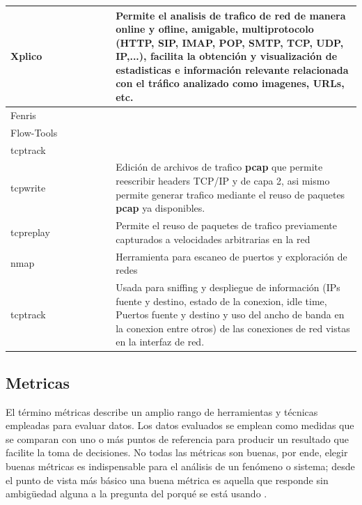 \documentclass[12pt]{article}
\begin{document}
\begin{table}[htbp]
\begin{tabular}{|p{0.3\linewidth}|p{0.7\linewidth}|}
Xplico & 
Permite el analisis de trafico de red de manera online y ofline, amigable, multiprotocolo (HTTP, SIP, IMAP, POP, SMTP, TCP, UDP, IP,...), facilita la obtención y visualización de estadisticas e información relevante relacionada con el tráfico analizado como imagenes, URLs, etc.
\tabularnewline \hline

Fenris & 

\tabularnewline \hline

Flow-Tools & 

\tabularnewline \hline

tcptrack & 

\tabularnewline \hline

tcpwrite & 
Edición de archivos de trafico \textbf{pcap} que permite reescribir headers TCP/IP y de capa 2, asi mismo permite generar trafico mediante el reuso de paquetes \textbf{pcap} ya disponibles. 
\tabularnewline \hline

tcpreplay &  
Permite el reuso de paquetes de trafico previamente capturados a velocidades arbitrarias en la red\tabularnewline \hline
nmap & Herramienta para escaneo de puertos y exploración de redes \tabularnewline \hline
tcptrack & Usada para sniffing y despliegue de información (IPs fuente y destino, estado de la conexion, idle time, Puertos fuente y destino y uso del ancho de banda en la conexion entre otros) de las conexiones de red vistas en la interfaz de red.   \tabularnewline \hline

\end{tabular}
\end{table}


\subsection{Metricas}

El término métricas describe un amplio rango de herramientas y técnicas empleadas para evaluar datos. Los datos evaluados se emplean como medidas que se comparan con uno o más puntos de referencia para producir un resultado que facilite la toma de decisiones. No todas las métricas son buenas, por ende, elegir buenas métricas es indispensable para el análisis de un fenómeno o sistema; desde el punto de vista más básico una buena métrica es aquella que responde sin ambigüedad alguna a la pregunta del porqué se está usando \citep{sans_ids_metrics}.
\end{document}
